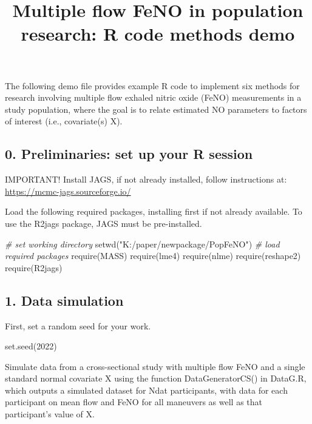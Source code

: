 \documentclass[
]{article}
\title{Multiple flow FeNO in population research: R code methods demo}
\author{}
\date{\vspace{-2.5em}}
\newenvironment{Shaded}{\begin{snugshade}}{\end{snugshade}}
\newcommand{\CommentTok}[1]{\textcolor[rgb]{0.56,0.35,0.01}{\textit{#1}}}
\newcommand{\DecValTok}[1]{\textcolor[rgb]{0.00,0.00,0.81}{#1}}
\newcommand{\FunctionTok}[1]{\textcolor[rgb]{0.00,0.00,0.00}{#1}}
\newcommand{\NormalTok}[1]{#1}
\newcommand{\StringTok}[1]{\textcolor[rgb]{0.31,0.60,0.02}{#1}}
\begin{document}
\maketitle

The following demo file provides example R code to implement six methods
for research involving multiple flow exhaled nitric oxide (FeNO)
measurements in a study population, where the goal is to relate
estimated NO parameters to factors of interest (i.e., covariate(s) X).

\hypertarget{preliminaries-set-up-your-r-session}{%
\subsection{0. Preliminaries: set up your R
session}\label{preliminaries-set-up-your-r-session}}

IMPORTANT! Install JAGS, if not already installed, follow instructions
at: \url{https://mcmc-jags.sourceforge.io/}

Load the following required packages, installing first if not already
available. To use the R2jags package, JAGS must be pre-installed.

\begin{Shaded}
\begin{Highlighting}[]
\CommentTok{\# set working directory}
\FunctionTok{setwd}\NormalTok{(}\StringTok{"K:/paper/newpackage/PopFeNO"}\NormalTok{)}
\CommentTok{\# load required packages}
\FunctionTok{require}\NormalTok{(MASS)}
\FunctionTok{require}\NormalTok{(lme4)}
\FunctionTok{require}\NormalTok{(nlme)}
\FunctionTok{require}\NormalTok{(reshape2)}
\FunctionTok{require}\NormalTok{(R2jags)}
\end{Highlighting}
\end{Shaded}

\hypertarget{data-simulation}{%
\subsection{1. Data simulation}\label{data-simulation}}

First, set a random seed for your work.

\begin{Shaded}
\begin{Highlighting}[]
\FunctionTok{set.seed}\NormalTok{(}\DecValTok{2022}\NormalTok{)}
\end{Highlighting}
\end{Shaded}

Simulate data from a cross-sectional study with multiple flow FeNO and a
single standard normal covariate X using the function DataGeneratorCS()
in DataG.R, which outputs a simulated dataset for Ndat participants,
with data for each participant on mean flow and FeNO for all maneuvers
as well as that participant's value of X.
\end{document}
